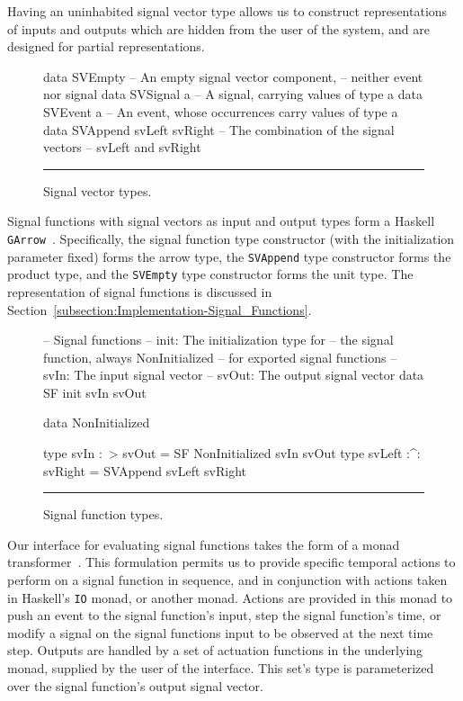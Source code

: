 Having an uninhabited signal vector type allows us to construct representations
of inputs and outputs which are hidden from the user of the system, and are
designed for partial representations.

\begin{figure}
\begin{code}
data SVEmpty    -- An empty signal vector component,
                -- neither event nor signal
data SVSignal a -- A signal, carrying values of type a
data SVEvent a  -- An event, whose occurrences carry values of type a
data SVAppend svLeft svRight -- The combination of the signal vectors
                             -- svLeft and svRight
\end{code}
\hrule
\caption{Signal vector types.}
\label{figure:signal_vector_types}
\end{figure}

Signal functions with signal vectors as input and output types form a
Haskell {\tt GArrow}~\cite{Megacz2011}. Specifically, the signal function
type constructor (with the initialization parameter fixed) forms the arrow
type, the {\tt SVAppend} type constructor forms the product type, and the
{\tt SVEmpty} type constructor forms the unit type.
%
The representation of signal functions is discussed in
Section~\ref{subsection:Implementation-Signal_Functions}.
\begin{figure}
\begin{code}
-- Signal functions
-- init: The initialization type for 
--   the signal function, always NonInitialized
--   for exported signal functions
-- svIn: The input signal vector
-- svOut: The output signal vector
data SF init svIn svOut

data NonInitialized

type svIn :~> svOut = SF NonInitialized svIn svOut
type svLeft :^: svRight = SVAppend svLeft svRight
\end{code}
\hrule
\caption{Signal function types.}
\label{figure:signal_function_types}
\end{figure}

Our interface for evaluating signal functions takes the form of a monad
transformer~\cite{Jones1995}. This formulation permits us to provide specific
temporal actions to perform on a signal function in sequence, and in conjunction
with actions taken in Haskell's {\tt IO} monad, or another monad. Actions are
provided in this monad to push an event to the signal function's input, step
the signal function's time, or modify a signal on the signal functions input to
be observed at the next time step. Outputs are handled by a set of actuation
functions in the underlying monad, supplied by the user of the interface. This
set's type is parameterized over the signal function's output signal vector.

